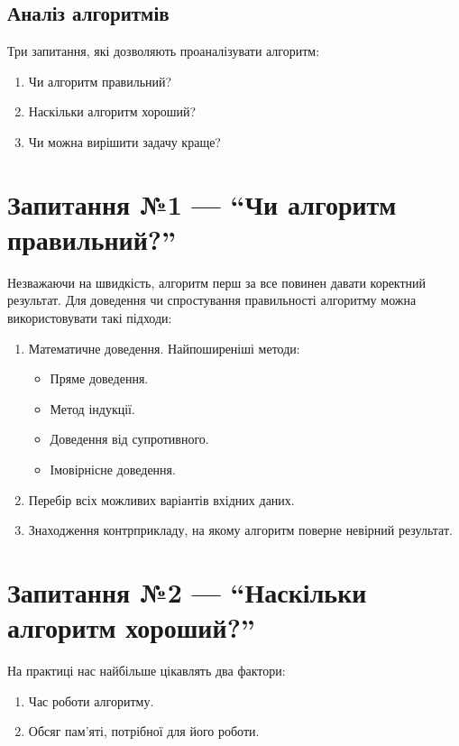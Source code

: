 \documentclass[12pt,a4paper]{report}
\begin{document}
\subsection*{Аналіз алгоритмів}
Три запитання, які дозволяють проаналізувати алгоритм:
\begin{enumerate}
    \item Чи алгоритм правильний?
    \item Наскільки алгоритм хороший?
    \item Чи можна вирішити задачу краще?
\end{enumerate}



\section{Запитання №1 --- ``Чи алгоритм правильний?''}
Незважаючи на швидкість, алгоритм перш за все повинен давати коректний результат.
Для доведення чи спростування правильності алгоритму можна використовувати такі підходи:
\begin{enumerate}
    \item Математичне доведення. Найпоширеніші методи:
        \begin{itemize}
            \item Пряме доведення.
            \item Метод індукції.
            \item Доведення від супротивного.
            \item Імовірнісне доведення.
        \end{itemize}
    \item Перебір всіх можливих варіантів вхідних даних.
    \item Знаходження контрприкладу, на якому алгоритм поверне невірний результат.
\end{enumerate}



\section{Запитання №2 --- ``Наскільки алгоритм хороший?''}
На практиці нас найбільше цікавлять два фактори:
\begin{enumerate}
    \item Час роботи алгоритму.
    \item Обсяг пам’яті, потрібної для його роботи.
\end{enumerate}
\end{document}

